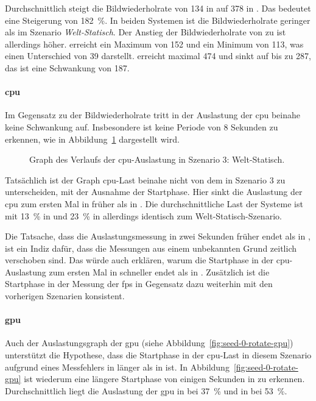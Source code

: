 Durchschnittlich steigt die Bildwiederholrate von \SI{134}{\fps} in \sysA{} auf \SI{378}{\fps} in \sysB{}. Das bedeutet eine Steigerung von \SI{182}{\percent}. In beiden Systemen ist die Bildwiederholrate geringer als im Szenario \emph{Welt-Statisch}. Der Anstieg der Bildwiederholrate von \sysA{} zu \sysB{} ist allerdings höher. \sysA{} erreicht ein Maximum von \SI{152}{\fps} und ein Minimum von \SI{113}{\fps}, was einen Unterschied von \SI{39}{\fps} darstellt. \sysB{} erreicht maximal \SI{474}{\fps} und sinkt auf bis zu \SI{287}{\fps}, das ist eine Schwankung von \SI{187}{\fps}.

\paragraph{\ac{cpu}}
Im Gegensatz zu der Bildwiederholrate tritt in der Auslastung der \ac{cpu} beinahe keine Schwankung auf. Insbesondere ist keine Periode von 8 Sekunden zu erkennen, wie in Abbildung~\ref{fig:seed-0-rotate-cpu} dargestellt wird.
\begin{figure}[!htbp]
	\caption[Graph des Verlaufs der -Auslastung in Szenario 4: Welt-Rotation.]{Graph des Verlaufs der \ac{cpu}-Auslastung in Szenario 3: Welt-Statisch.}\label{fig:seed-0-rotate-cpu}
\end{figure}
Tatsächlich ist der Graph \ac{cpu}-Last beinahe nicht von dem in Szenario 3 zu unterscheiden, mit der Ausnahme der Startphase. Hier sinkt die Auslastung der \ac{cpu} zum ersten Mal in \sysB{} früher als in \sysA{}. Die durchschnittliche Last der Systeme  ist mit \SI{13}{\percent} in \sysA{} und \SI{23}{\percent} in \sysB{} allerdings identisch zum Welt-Statisch-Szenario.

Die Tatsache, dass die Auslastungsmessung in \sysB{} zwei Sekunden früher endet als in \sysA{}, ist ein Indiz dafür, dass die Messungen aus einem unbekannten Grund zeitlich verschoben sind. Das würde auch erklären, warum die Startphase in der \ac{cpu}-Auslastung zum ersten Mal in \sysB{} schneller endet als in \sysA{}. Zusätzlich ist die Startphase in der Messung der \ac{fps} in Gegensatz dazu weiterhin mit den vorherigen Szenarien konsistent. 

\paragraph{\ac{gpu}}
Auch der Auslastungsgraph der \ac{gpu} (siehe Abbildung~\ref{fig:seed-0-rotate-gpu}) unterstützt die Hypothese, dass die Startphase in der \ac{cpu}-Last in diesem Szenario aufgrund eines Messfehlers in \sysA{} länger als in \sysB{} ist. In Abbildung~\ref{fig:seed-0-rotate-gpu} ist wiederum eine längere Startphase von einigen Sekunden in \sysB{} zu erkennen. Durchschnittlich liegt die Auslastung der \ac{gpu} in \sysA{} bei \SI{37}{\percent} und in \sysB{} bei \SI{53}{\percent}. 

